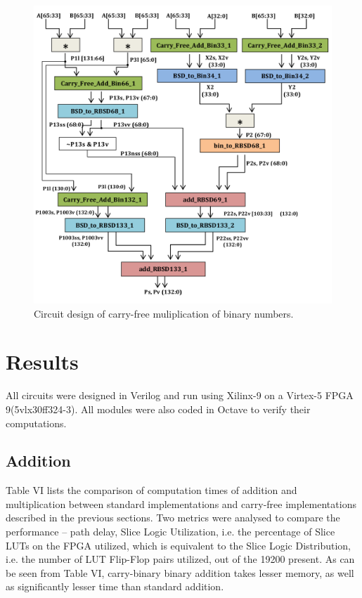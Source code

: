 \documentclass[conference]{IEEEtran}
\begin{document}
\begin{figure}[!t]
\centering
\includegraphics[width=\linewidth]{Mul.png}
\caption{Circuit design of carry-free muliplication of binary numbers.}
\label{fig_sim}
\end{figure}


\section{Results}

All circuits were designed in Verilog and run using Xilinx-9 on a Virtex-5 FPGA 9(5vlx30ff324-3). All modules were also coded in Octave to verify their computations.

\subsection{Addition}

Table VI lists the comparison of computation times of addition and multiplication between standard implementations and carry-free implementations described in the previous sections. Two metrics were analysed to compare the performance – path delay, Slice Logic Utilization, i.e. the percentage of Slice LUTs on the FPGA utilized, which is equivalent to the Slice Logic Distribution, i.e. the number of LUT Flip-Flop pairs utilized, out of the 19200 present. As can be seen from Table VI, carry-binary binary addition takes lesser memory, as well as significantly lesser time than standard addition.
\end{document}
